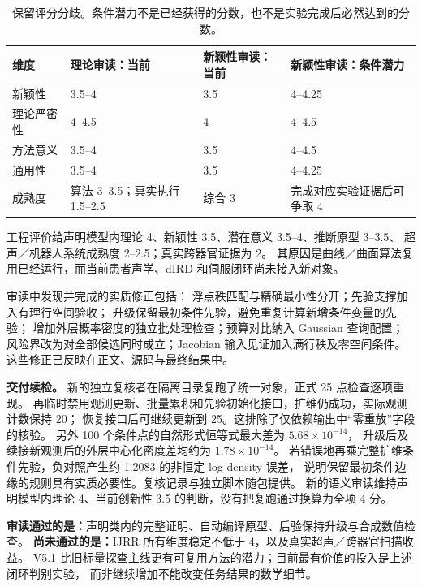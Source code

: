 \documentclass[11pt,a4paper]{article}
\numberwithin{equation}{section}
\theoremstyle{definition}
\begin{document}
\begin{table}[ht]
\centering\small
\begin{tabularx}{\linewidth}{p{.18\linewidth}YYY}
\toprule
维度 & 理论审读：当前 & 新颖性审读：当前 & 新颖性审读：条件潜力\\
\midrule
新颖性 & 3.5--4 & 3.5 & 4--4.25\\
理论严密性 & 4--4.5 & 4 & 4--4.5\\
方法意义 & 3.5--4 & 3.5 & 4--4.5\\
通用性 & 3.5--4 & 3.5 & 4--4.25\\
成熟度 & 算法 3--3.5；真实执行 1.5--2.5 & 综合 3 & 完成对应实验证据后可争取 4\\
\bottomrule
\end{tabularx}
\caption{保留评分分歧。条件潜力不是已经获得的分数，也不是实验完成后必然达到的分数。}
\end{table}

工程评价给声明模型内理论 4、新颖性 3.5、潜在意义 3.5--4、推断原型 3--3.5、
超声／机器人系统成熟度 2--2.5；真实跨器官证据为 2。
其原因是曲线／曲面算法复用已经运行，而当前患者声学、dIRD 和伺服闭环尚未接入新对象。

审读中发现并完成的实质修正包括：
浮点秩匹配与精确最小性分开；先验支撑加入有理行空间验收；
升级保留最初条件先验，避免重复计算新增条件变量的先验；
增加外层概率密度的独立批处理检查；预算对比纳入 Gaussian 查询配置；
风险界改为对全部候选同时成立；Jacobian 输入见证加入满行秩及零空间条件。
这些修正已反映在正文、源码与最终结果中。

\textbf{交付续检。}
新的独立复核者在隔离目录复跑了统一对象，正式 25 点检查逐项重现。
再临时禁用观测更新、批量累积和先验初始化接口，扩维仍成功，实际观测计数保持 20；
恢复接口后可继续更新到 25。这排除了仅依赖输出中“零重放”字段的核验。
另外 100 个条件点的自然形式恒等式最大差为 \(5.68\times10^{-14}\)，
升级后及续接新观测后的外层中心化密度差均约为 \(1.78\times10^{-14}\)。
若错误地再乘完整扩维条件先验，负对照产生约 1.2083 的非恒定 log density 误差，
说明保留最初条件边缘的规则具有实质必要性。复核记录与独立脚本随包提供。
新的语义审读维持声明模型内理论 4、当前创新性 3.5 的判断，没有把复跑通过换算为全项 4 分。

\textbf{审读通过的是：}声明类内的完整证明、自动编译原型、后验保持升级与合成数值检查。
\textbf{尚未通过的是：}IJRR 所有维度稳定不低于 4，以及真实超声／跨器官扫描收益。
V5.1 比旧标量探查主线更有可复用方法的潜力；目前最有价值的投入是上述闭环判别实验，
而非继续增加不能改变任务结果的数学细节。
\end{document}
